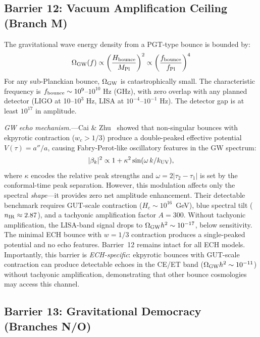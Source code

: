 \documentclass[aps,prd,twocolumn,superscriptaddress,showpacs,preprintnumbers,nofootinbib,longbibliography,floatfix]{revtex4-2}
\newcommand{\MPl}{M_{\rm Pl}}
\begin{document}
\subsection{Barrier 12: Vacuum Amplification Ceiling (Branch M)}

The gravitational wave energy density from a PGT-type bounce is bounded by:
\begin{equation}
\Omega_{\rm GW}(f) \propto \left(\frac{H_{\rm bounce}}{\MPl}\right)^2 \propto \left(\frac{f_{\rm bounce}}{f_{\rm Pl}}\right)^4
\end{equation}
For any sub-Planckian bounce, $\Omega_{\rm GW}$ is catastrophically small. The characteristic frequency is $f_{\rm bounce} \sim 10^9$--$10^{10}$ Hz (GHz), with zero overlap with any planned detector (LIGO at 10--$10^3$ Hz, LISA at $10^{-4}$--$10^{-1}$ Hz). The detector gap is at least $10^{17}$ in amplitude.

\textit{GW echo mechanism.}---Cai \& Zhu~\cite{Cai:2026echoes} showed that non-singular bounces with ekpyrotic contraction ($w_c > 1/3$) produce a double-peaked effective potential $V(\tau) = a''/a$, causing Fabry-Perot-like oscillatory features in the GW spectrum:
\begin{equation}\label{eq:gw_echo}
|\beta_k|^2 \propto 1 + \kappa^2\sin(\omega\, k/k_{\rm UV}),
\end{equation}
where $\kappa$ encodes the relative peak strengths and $\omega = 2|\tau_2 - \tau_1|$ is set by the conformal-time peak separation. However, this modulation affects only the spectral \emph{shape}---it provides zero net amplitude enhancement. Their detectable benchmark requires GUT-scale contraction ($H_c \sim 10^{16}$~GeV), blue spectral tilt ($n_{\rm IR} \approx 2.87$), and a tachyonic amplification factor $A = 300$. Without tachyonic amplification, the LISA-band signal drops to $\Omega_{\rm GW}h^2 \sim 10^{-17}$, below sensitivity. The minimal ECH bounce with $w = 1/3$ contraction produces a single-peaked potential and no echo features. Barrier~12 remains intact for all ECH models. Importantly, this barrier is \emph{ECH-specific}: ekpyrotic bounces with GUT-scale contraction can produce detectable echoes in the CE/ET band ($\Omega_{\rm GW}h^2 \sim 10^{-11}$) without tachyonic amplification, demonstrating that other bounce cosmologies may access this channel.

\subsection{Barrier 13: Gravitational Democracy (Branches N/O)}
\end{document}
